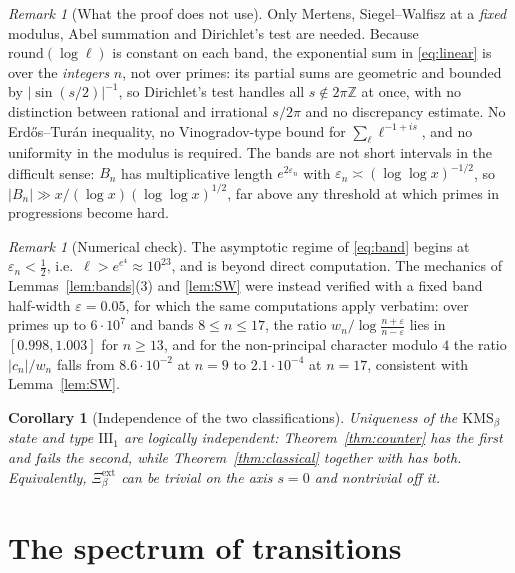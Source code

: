\documentclass[11pt]{amsart}
\numberwithin{equation}{section}
\newtheorem{corollary}[theorem]{Corollary}
\theoremstyle{definition}
\theoremstyle{remark}
\newtheorem{remark}[theorem]{Remark}
\newcommand{\Z}{\mathbb{Z}}
\newcommand{\Xiext}{\Xi^{\mathrm{ext}}_\beta}
\begin{document}
\begin{remark}[What the proof does not use]\label{rem:tools}
Only Mertens, Siegel--Walfisz at a \emph{fixed} modulus, Abel summation and Dirichlet's test
are needed. Because $\mathrm{round}(\log\ell)$ is constant on each band, the exponential sum
in \eqref{eq:linear} is over the \emph{integers} $n$, not over primes: its partial sums are
geometric and bounded by $|\sin(s/2)|^{-1}$, so Dirichlet's test handles all $s\notin2\pi\Z$
at once, with no distinction between rational and irrational $s/2\pi$ and no discrepancy
estimate. No Erd\H{o}s--Tur\'an inequality, no Vinogradov-type bound for
$\sum_\ell\ell^{-1+is}$, and no uniformity in the modulus is required. The bands are not
short intervals in the difficult sense: $B_n$ has multiplicative length $e^{2\varepsilon_n}$
with $\varepsilon_n\asymp(\log\log x)^{-1/2}$, so $|B_n|\gg x/(\log x)(\log\log x)^{1/2}$,
far above any threshold at which primes in progressions become hard.
\end{remark}

\begin{remark}[Numerical check]\label{rem:numtype}
The asymptotic regime of \eqref{eq:band} begins at $\varepsilon_n<\tfrac12$, i.e.\
$\ell>e^{e^4}\approx10^{23}$, and is beyond direct computation. The mechanics of
Lemmas~\ref{lem:bands}(3) and \ref{lem:SW} were instead verified with a fixed band
half-width $\varepsilon=0.05$, for which the same computations apply verbatim: over primes
up to $6\cdot10^7$ and bands $8\le n\le17$, the ratio
$w_n\big/\log\frac{n+\varepsilon}{n-\varepsilon}$ lies in $[0.998,1.003]$ for $n\ge13$, and
for the non-principal character modulo $4$ the ratio $|c_n|/w_n$ falls from
$8.6\cdot10^{-2}$ at $n=9$ to $2.1\cdot10^{-4}$ at $n=17$, consistent with
Lemma~\ref{lem:SW}.
\end{remark}

\begin{corollary}[Independence of the two classifications]\label{cor:indep}
Uniqueness of the $\mathrm{KMS}_\beta$ state and type $\mathrm{III}_1$ are logically
independent: Theorem~\ref{thm:counter} has the first and fails the second, while
Theorem~\ref{thm:classical} together with \cite[Cor.~3.10]{Main} has both. Equivalently,
$\Xiext$ can be trivial on the axis $s=0$ and nontrivial off it.
\end{corollary}

\section{The spectrum of transitions}\label{sec:spectrum}
\end{document}

